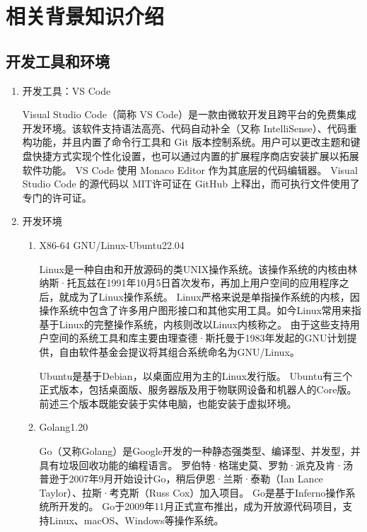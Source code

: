 \section{相关背景知识介绍}

	\subsection{开发工具和环境}
  
  	\begin{enumerate}[fullwidth,itemindent=2em,listparindent=2em]

  		\item 开发工具：VS Code
  		
		Visual Studio Code（简称 VS Code）是一款由微软开发且跨平台的免费集成开发环境。该软件支持语法高亮、代码自动补全（又称 IntelliSense）、代码重构功能，并且内置了命令行工具和 Git 版本控制系统。用户可以更改主题和键盘快捷方式实现个性化设置，也可以通过内置的扩展程序商店安装扩展以拓展软件功能。
		VS Code 使用 Monaco Editor 作为其底层的代码编辑器。
		Visual Studio Code 的源代码以 MIT许可证在 GitHub 上释出，而可执行文件使用了专门的许可证。
			
		\item 开发环境
			\begin{enumerate}
				\item X86-64 GNU/Linux-Ubuntu22.04
				
				Linux是一种自由和开放源码的类UNIX操作系统。该操作系统的内核由林纳斯·托瓦兹在1991年10月5日首次发布，再加上用户空间的应用程序之后，就成为了Linux操作系统。
				Linux严格来说是单指操作系统的内核，因操作系统中包含了许多用户图形接口和其他实用工具。如今Linux常用来指基于Linux的完整操作系统，内核则改以Linux内核称之。
				由于这些支持用户空间的系统工具和库主要由理查德·斯托曼于1983年发起的GNU计划提供，自由软件基金会提议将其组合系统命名为GNU/Linux。
				
				Ubuntu是基于Debian，以桌面应用为主的Linux发行版。
				Ubuntu有三个正式版本，包括桌面版、服务器版及用于物联网设备和机器人的Core版。
				前述三个版本既能安装于实体电脑，也能安装于虚拟环境。
				
				\item Golang1.20
				
				Go（又称Golang）是Google开发的一种静态强类型、编译型、并发型，并具有垃圾回收功能的编程语言。
				罗伯特·格瑞史莫、罗勃·派克及肯·汤普逊于2007年9月开始设计Go，稍后伊恩·兰斯·泰勒（Ian Lance Taylor）、拉斯·考克斯（Russ Cox）加入项目。
				Go是基于Inferno操作系统所开发的。
				Go于2009年11月正式宣布推出，成为开放源代码项目，支持Linux、macOS、Windows等操作系统。
			

\end{enumerate}
\end{enumerate}
